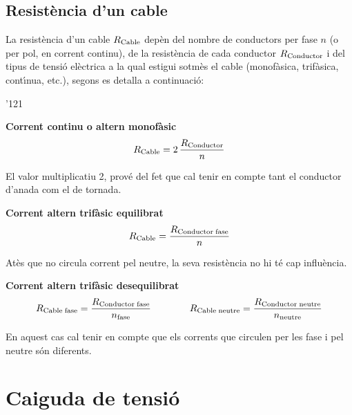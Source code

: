 \subsection{Resist\`{e}ncia d'un cable}

La resist\`{e}ncia d'un cable $R_\mathrm{Cable}$ dep\`{e}n del nombre de conductors per fase $n$ (o
per pol, en corrent continu), de la resist\`{e}ncia de cada conductor $R_\mathrm{Conductor}$ i del
tipus de tensi\'{o} el\`{e}ctrica a la qual estigui sotm\`{e}s el cable (monof\`{a}sica, trif\`{a}sica,
cont\'{\i}nua, etc.), segons es detalla a continuaci\'{o}:

\begin{dinglist}{'121}
    \item \textbf{Corrent continu o altern monof\`{a}sic}
    \begin{equation}\label{eq:r_cc_mono}
    R_\mathrm{Cable} = 2\, \frac{R_\mathrm{Conductor}}{n}
    \end{equation}

    El valor multiplicatiu 2, prov\'{e} del fet que cal tenir en compte tant el conductor d'anada
    com el de tornada. \vspace{0.5cm}

    \item \textbf{Corrent altern trif\`{a}sic equilibrat}
    \begin{equation}\label{eq:r_trifas}
    R_\mathrm{Cable} = \frac{R_\mathrm{Conductor\;fase}}{n}
    \end{equation}

    At\`{e}s que no circula corrent pel neutre, la seva resist\`{e}ncia no hi t\'{e} cap influ\`{e}ncia.
    \vspace{0.5cm}

    \item \textbf{Corrent altern trif\`{a}sic desequilibrat}
    \begin{equation}
    R_\mathrm{Cable\;fase} = \frac{R_\mathrm{Conductor\;fase}}{n_\mathrm{fase}} \qquad\qquad
    R_\mathrm{Cable\; neutre} = \frac{R_\mathrm{Conductor\;neutre}}{n_\mathrm{neutre}}
    \end{equation}

    En aquest cas cal tenir en compte que els corrents que circulen per les fase i pel neutre
    s\'{o}n diferents.
\end{dinglist}


\section{Caiguda de tensi\'{o}}

